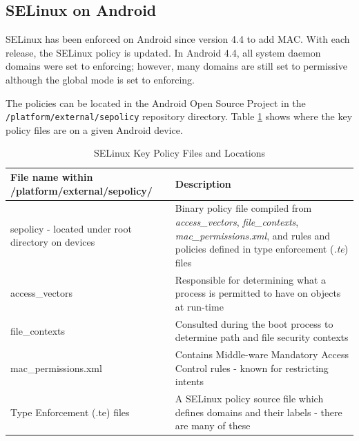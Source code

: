 \documentclass[conference]{IEEEtran}
\begin{document}
\subsection{SELinux on Android}\label{sec:seandroidprimer}
SELinux has been enforced on Android since version 4.4 to add MAC.  With each release, the SELinux policy is updated.  In Android 4.4, all system daemon domains were set to enforcing; however, many domains are still set to permissive although the global mode is set to enforcing.

The policies can be located in the Android Open Source Project in the \verb|/platform/external/sepolicy| repository directory.  Table \ref{tbl:selinuxfiles} shows where the key policy files are on a given Android device.
%
%

\begin{table}
  \begin{tabular}{|| p{3cm} | p{4.5cm} ||} 
    \hline
    File name within /platform/external/sepolicy/ & Description \\ [0.5ex] 
    \hline\hline
    sepolicy - located under root directory on devices & Binary policy file compiled from \textit{access\_vectors}, \textit{file\_contexts}, \textit{mac\_permissions.xml}, and rules and policies defined in type enforcement (\textit{.te}) files  \\ 
    \hline
    access\_vectors &   Responsible for determining what a process is permitted to have on objects at run-time\\
    \hline
    file\_contexts & Consulted during the boot process to determine path and file security contexts  \\
    \hline
    mac\_permissions.xml & Contains Middle-ware Mandatory Access Control rules - known for restricting intents \\
    \hline
    Type Enforcement (.te) files & A SELinux policy source file which defines domains and their labels - there are many of these  \\ [1ex] 
    \hline
  \end{tabular}
  
  \caption{SELinux Key Policy Files and Locations}
  \label{tbl:selinuxfiles}
\end{table}
\end{document}
